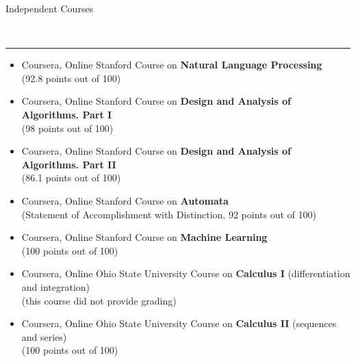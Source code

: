 \documentclass{article}
\newcommand{\cvheader}[1]{\vspace{0.5cm}
  {\raggedright \Large \sc #1}\\\rule[1em]{\textwidth}{0.1mm}}
\begin{document}
\cvheader{Independent Courses}
\begin{itemize}
\item Coursera, Online Stanford Course on \textbf{Natural Language
  Processing}\\(92.8 points out of 100)
\item Coursera, Online Stanford Course on \textbf{Design and Analysis
  of Algorithms. Part I}\\(98 points out of 100)
\item Coursera, Online Stanford Course on \textbf{Design and Analysis
  of Algorithms. Part II}\\(86.1 points out of 100)
\item Coursera, Online Stanford Course on
  \textbf{Automata}\\(Statement of Accomplishment with Distinction, 92
  points out of 100)
\item Coursera, Online Stanford Course on \textbf{Machine
  Learning}\\(100 points out of 100)
\item Coursera, Online Ohio State University Course on
  \textbf{Calculus I} (differentiation and integration)\\(this course did not provide grading)
\item Coursera, Online Ohio State University Course on
  \textbf{Calculus II} (sequences and series)\\(100 points out of 100)
\end{itemize}
\end{document}

